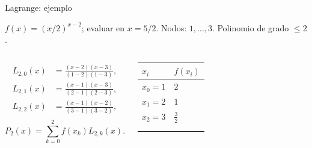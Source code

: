 \documentclass[original_version/main.tex]{subfiles}
\begin{document}
\begin{frame}[t]{Lagrange: ejemplo}
\par\noindent\begin{minipage}[t][7.5mm][t]{\textwidth}\small\strut $f(x)=(x/2)^{x-2}$; evaluar en $x=5/2$. Nodos: $1,\ldots,3$. Polinomio de grado $\le 2$.\end{minipage}\par\nointerlineskip
\begin{columns}[T]\small\setlength{\abovedisplayskip}{4pt}\setlength{\belowdisplayskip}{4pt}\scriptsize\begin{align*}L_{2,0}(x)&=\frac{(x-2)(x-3)}{(1-2)(1-3)},\\L_{2,1}(x)&=\frac{(x-1)(x-3)}{(2-1)(2-3)},\\L_{2,2}(x)&=\frac{(x-1)(x-2)}{(3-1)(3-2)},\\\end{align*}\[P_2(x)=\sum_{k=0}^2f(x_k)L_{2,k}(x).\]\begingroup\small\setlength{\tabcolsep}{3pt}\begin{center}\begin{tabular}{|C{.42\textwidth}|C{.42\textwidth}|}\hline
\rule[-2mm]{0pt}{6mm}$x_i$&$f(x_i)$\\\hline
\rule[-2.5mm]{0pt}{6mm}$x_0=1$&$2$\\\hline
\rule[-2.5mm]{0pt}{6mm}$x_1=2$&$1$\\\hline
\rule[-2.5mm]{0pt}{6mm}$x_2=3$&$\frac{3}{2}$\\\hline
\rule[-2.5mm]{0pt}{6mm}&\\\hline
\rule[-2.5mm]{0pt}{6mm}&\\\hline
\end{tabular}\end{center}\endgroup\par
\end{columns}
\end{frame}
\end{document}
